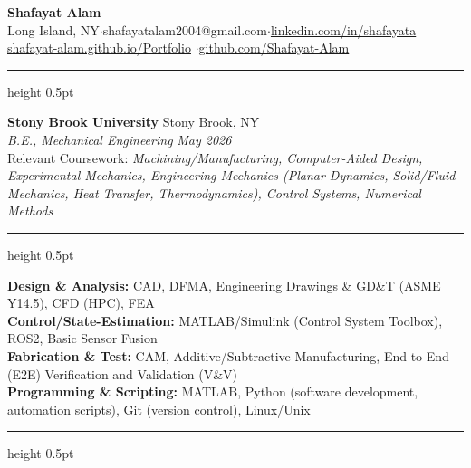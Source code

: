 \documentclass[11pt]{article}
\begin{document}
\begin{center}
{\LARGE\textbf{Shafayat Alam}}\\
{\small Long Island, NY\enspace$\cdot$\enspace shafayatalam2004@gmail.com\enspace$\cdot$\enspace \href{https://linkedin.com/in/shafayata}{linkedin.com/in/shafayata}}\\
{\small \href{https://shafayat-alam.github.io/Portfolio/}{shafayat-alam.github.io/Portfolio}} \enspace$\cdot$\enspace \href{https://github.com/Shafayat-Alam}{github.com/Shafayat-Alam} 
\end{center}

\vspace{3pt}
\hrule height 0.5pt
\vspace{3pt}

\noindent\textbf{Stony Brook University} \hfill Stony Brook, NY\\
\textit{B.E., Mechanical Engineering} \hfill \textit{May 2026}\\
Relevant Coursework: \textit{Machining/Manufacturing, Computer-Aided Design, Experimental Mechanics, Engineering Mechanics (Planar Dynamics, Solid/Fluid Mechanics, Heat Transfer, Thermodynamics), Control Systems, Numerical Methods}

\vspace{5pt}

\vspace{3pt}
\hrule height 0.5pt
\vspace{3pt}

\noindent\textbf{Design \& Analysis:} CAD, DFMA, Engineering Drawings \& GD\&T (ASME Y14.5), CFD (HPC), FEA \\[1pt]
\textbf{Control/State-Estimation:} MATLAB/Simulink (Control System Toolbox), ROS2, Basic Sensor Fusion\\[1pt]
\textbf{Fabrication \& Test:} CAM, Additive/Subtractive Manufacturing, End-to-End (E2E) Verification and Validation (V\&V)\\[1pt]
\textbf{Programming \& Scripting:} MATLAB, Python (software development, automation scripts), Git (version control), Linux/Unix

\vspace{5pt}

\vspace{3pt}
\hrule height 0.5pt
\vspace{3pt}
\end{document}
